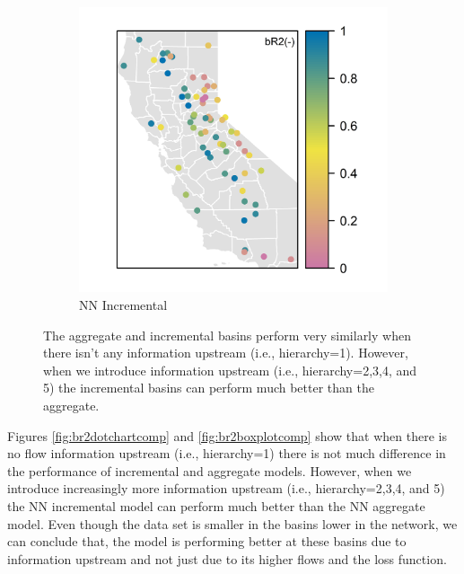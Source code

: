 \begin{figure}
\begin{subfigure}{.5\textwidth}
 		 \includegraphics[width=\textwidth, trim={0 0 0 0}, clip=true]{plots/rplot28_br2map_nn_inc.png}
  		\caption{NN Incremental}
	\end{subfigure}%
	\hfill
	\caption{The aggregate and incremental basins perform very similarly when there isn't any information upstream (i.e., hierarchy=1). However, when we introduce information upstream (i.e., hierarchy=2,3,4, and 5) the incremental basins can perform much better than the aggregate.}
	\label{fig:aggincbr2comp}
\end{figure}

Figures \ref{fig:br2dotchartcomp} and \ref{fig:br2boxplotcomp} show that when there is no flow information upstream (i.e., hierarchy=1) there is not much difference in the performance of incremental and aggregate models. However, when we introduce increasingly more information upstream (i.e., hierarchy=2,3,4, and 5) the NN incremental model can perform much better than the NN aggregate model. Even though the data set is smaller in the basins lower in the network, we can conclude that, the model is performing better at these basins due to information upstream and not just due to its higher flows and the loss function. 

